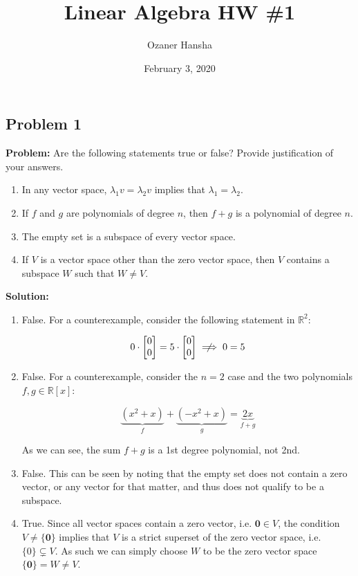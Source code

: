 \documentclass{article}
\renewcommand\vec{\mathbf}
\begin{document}
\title{Linear Algebra HW \#1}
\author{Ozaner Hansha}
\date{February 3, 2020}
\maketitle

\subsection*{Problem 1}
\noindent\textbf{Problem:} Are the following statements true or false? Provide justification of your answers.
\begin{enumerate}[label=\alph*)]
    \item In any vector space, $\lambda_1v=\lambda_2v$ implies that $\lambda_1=\lambda_2$.
    \item If $f$ and $g$ are polynomials of degree $n$, then $f + g$ is a polynomial of degree $n$.
    \item The empty set is a subspace of every vector space.
    \item If $V$ is a vector space other than the zero vector space, then $V$ contains a subspace $W$
    such that $W \not= V$.
  \end{enumerate}
\bigskip

\noindent\textbf{Solution:} 

\begin{enumerate}[label=\alph*)]
    \item False. For a counterexample, consider the following statement in $\mathbb R^2$:

    \[0\cdot\begin{bmatrix}
        0 \\
        0 
    \end{bmatrix}=5\cdot\begin{bmatrix}
        0 \\
        0 
    \end{bmatrix}\centernot\implies0=5\]

    \item False. For a counterexample, consider the $n=2$ case and the two polynomials $f,g\in\mathbb R[x]$:
    
    $$\underbrace{(x^2+x)}_{f}+\underbrace{(-x^2+x)}_{g}=\underbrace{2x}_{f+g}$$

    \hspace{10pt} As we can see, the sum $f+g$ is a 1st degree polynomial, not 2nd.

    \item False. This can be seen by noting that the empty set does not contain a zero vector, or any vector for that matter, and thus does not qualify to be a subspace.
    \item True. Since all vector spaces contain a zero vector, i.e. $\vec 0\in V$, the condition $V\not=\{\vec 0\}$ implies that $V$ is a strict superset of the zero vector space, i.e. $\{0\}\subsetneq V$. As such we can simply choose $W$ to be the zero vector space $\{\vec 0\}=W\not=V$.
  \end{enumerate}
\end{document}
